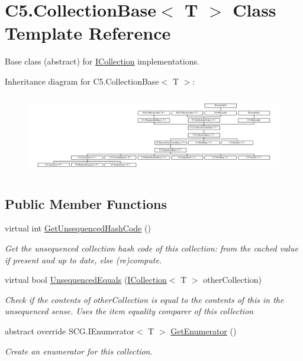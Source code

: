 \hypertarget{class_c5_1_1_collection_base}{}\section{C5.\+Collection\+Base$<$ T $>$ Class Template Reference}
\label{class_c5_1_1_collection_base}


Base class (abstract) for \hyperlink{interface_c5_1_1_i_collection}{I\+Collection} implementations.  


Inheritance diagram for C5.\+Collection\+Base$<$ T $>$\+:\begin{figure}[H]
\begin{center}
\leavevmode
\includegraphics[height=3.546798cm]{class_c5_1_1_collection_base}
\end{center}
\end{figure}
\subsection*{Public Member Functions}
\begin{DoxyCompactItemize}
\item 
virtual int \hyperlink{class_c5_1_1_collection_base_a165f2e0e454cdd3d02c632afd44e0f0f}{Get\+Unsequenced\+Hash\+Code} ()
\begin{DoxyCompactList}\small\item\em Get the unsequenced collection hash code of this collection\+: from the cached value if present and up to date, else (re)compute. \end{DoxyCompactList}\item 
virtual bool \hyperlink{class_c5_1_1_collection_base_aacf42049e95f0bb781fcb1be9c3142a8}{Unsequenced\+Equals} (\hyperlink{interface_c5_1_1_i_collection}{I\+Collection}$<$ T $>$ other\+Collection)
\begin{DoxyCompactList}\small\item\em Check if the contents of other\+Collection is equal to the contents of this in the unsequenced sense. Uses the item equality comparer of this collection \end{DoxyCompactList}\item 
abstract override S\+C\+G.\+I\+Enumerator$<$ T $>$ \hyperlink{class_c5_1_1_collection_base_a3b4b98e2606afecb948019412c4c2533}{Get\+Enumerator} ()
\begin{DoxyCompactList}\small\item\em Create an enumerator for this collection. \end{DoxyCompactList}\end{DoxyCompactItemize}
